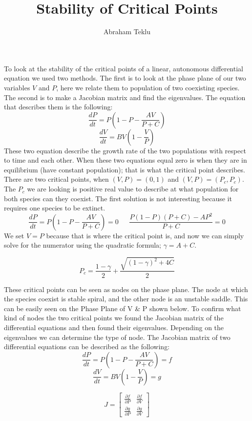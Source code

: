 \documentclass[12]{article}
\begin{document}
\title{Stability of Critical Points}
\author{Abraham Teklu}
\date{}
\maketitle
To look at the stability of the critical points of a linear, autonomous differential equation we used two methods. The first is to look at the phase plane of our two variables $V$ and $P$, here we relate them to population of two coexisting species. The second is to make a Jacobian matrix and find the eigenvalues. The equation that describes them is the following:
\begin{equation}
\frac{dP}{dt} = P\left(1-P-\frac{AV}{P+C}\right)
\end{equation} 
\begin{equation}
\frac{dV}{dt} = BV(1-\frac{V}{P})
\end{equation}
These two equation describe the growth rate of the two populations with respect to time and each other. When these two equations equal zero is when they are in equilibrium (have constant population); that is what the critical point describes. There are two critical points, when $(V,P) = (0,1)$ and $(V,P) = (P_c,P_c)$. The $P_c$ we are looking is positive real value to describe at what population  for both species can they coexist. The first solution is not interesting because it requires one species to be extinct.
$$\frac{dP}{dt} = P\left(1-P-\frac{AV}{P+C}\right) = 0~~~~~~~
\frac{P(1-P)(P+C)-AP^2}{P+C} = 0$$ 
We set $V = P$ because that is where the critical point is, and now we can simply solve for the numerator using the quadratic formula; $\gamma = A + C$.

$$P_c = \frac{1-\gamma}{2} + \frac{\sqrt{(1-\gamma)^2 + 4C}}{2}$$

These critical points can be seen as nodes on the phase plane. The node at which the species coexist is stable spiral, and the other node is an unstable saddle. This can be easily seen on the Phase Plane of V \& P shown below. To confirm what kind of nodes the two critical points we found the Jacobian matrix of the differential equations and then found their eigenvalues. Depending on the eigenvalues we can determine the type of node. The Jacobian matrix of two differential equations can be described as the following:
$$\frac{dP}{dt} = P\left(1-P-\frac{AV}{P+C}\right) = f$$ 
$$\frac{dV}{dt} = BV(1-\frac{V}{P}) = g$$

\begin{Large}
$$J = \begin{bmatrix}
\frac{\partial f}{\partial P} & \frac{\partial f}{\partial V}\\
\frac{\partial g}{\partial P} & \frac{\partial g}{\partial V}
\end{bmatrix}
$$
\end{Large}
\end{document}
